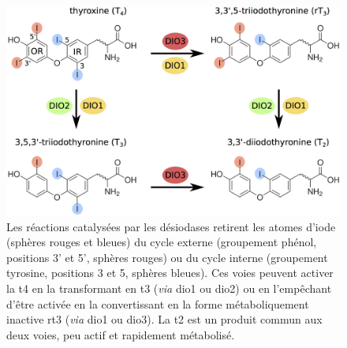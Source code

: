 \begin{figure}[!htbp]
\centering
\vspace{1\baselineskip}
\includegraphics[width=\textwidth]
{Figures/ht-dio/ht-dio.png}
\caption[Réactions de désiodation de base]
{
Les réactions catalysées par les désiodases retirent les atomes d'iode (sphères rouges et bleues) du cycle externe (groupement phénol, positions 3' et 5', sphères rouges) ou du cycle interne (groupement tyrosine, positions 3 et 5, sphères bleues).
Ces voies peuvent activer la \gls{t4} en la transformant en \gls{t3} (\textit{via} \gls{dio1} ou \gls{dio2}) ou en l'empêchant d'être activée en la convertissant en la forme métaboliquement inactive \gls{rt3} (\textit{via} \gls{dio1} ou \gls{dio3}). La \gls{t2} est un produit commun aux deux voies, peu actif et rapidement métabolisé.
}
\label{fig:ht-dio}
\end{figure}